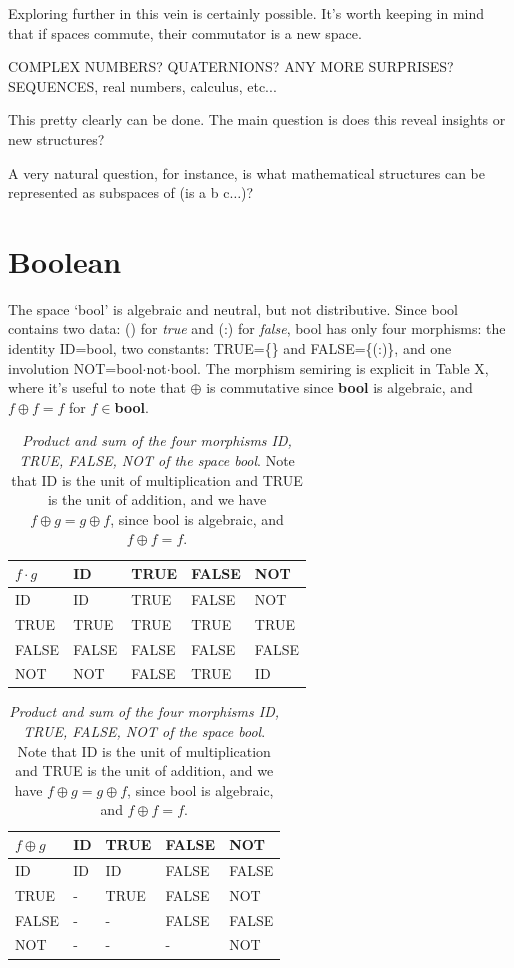 \documentclass[11pt]{article}
\begin{document}
Exploring further in this vein is certainly possible.  It's worth keeping in mind that if spaces commute, their commutator is a new space.  

COMPLEX NUMBERS? QUATERNIONS?  ANY MORE SURPRISES? SEQUENCES, real numbers, calculus, etc... 

This pretty clearly can be done.  The main question is does this reveal insights or new structures?  

A very natural question, for instance, is what mathematical structures can be represented as subspaces of (is a b c$\dots$)?  

\section{Boolean} 

      The space `bool' is algebraic and neutral, but not distributive.  Since bool contains two data:  () for {\it true} and (:) for {\it false},   
 bool has only four morphisms:  the identity ID=bool, two constants: TRUE=\{\} and FALSE=\{(:)\}, and one involution 
 NOT=bool$\cdot$not$\cdot$bool.  The morphism semiring is explicit in Table X, where it's useful to note that $\oplus$ is commutative since {\bf bool} is 
 algebraic, and $f\oplus f=f$ for $f\in${\bf bool}.  

\begin{table}
\begin{tabular}{| l | l | l | l | l |  }
$f\cdot g$ & ID & TRUE & FALSE & NOT  \\
\hline
ID &  ID & TRUE & FALSE &  NOT \\
TRUE & TRUE & TRUE  & TRUE & TRUE \\
FALSE & FALSE  & FALSE & FALSE & FALSE   \\
NOT & NOT & FALSE & TRUE & ID \\
\hline
\end{tabular}
\begin{tabular}{| l | l | l | l | l |  }
$f\oplus g$ & ID & TRUE & FALSE & NOT  \\
\hline
ID &  ID & ID & FALSE & FALSE \\
TRUE & - & TRUE  & FALSE & NOT \\
FALSE & -  & - & FALSE & FALSE   \\
NOT & - & - & - & NOT \\
\hline
\end{tabular}
\caption{{\it Product and sum of the four morphisms ID, TRUE, FALSE, NOT of the space bool}.  Note that ID is the unit of multiplication and TRUE is the 
unit of addition, and we have $f\oplus g=g\oplus f$, since bool is algebraic, and $f\oplus f=f$.}
\end{table}
\end{document}
